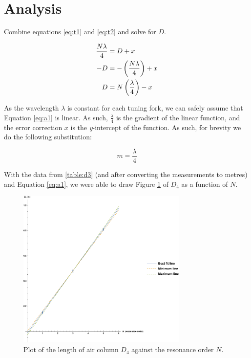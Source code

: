 \documentclass[letter]{article}
\numberwithin{equation}{section}
\numberwithin{figure}{section}
\numberwithin{table}{section}
\begin{document}
\section{Analysis}
Combine equations \eqref{eq:t1} and \eqref{eq:t2} and solve for \(D\).

\begin{align} \label{eq:a1}
  \frac{N \lambda}{4} &= D + x \notag \\
  -D &= - \left (\frac{N \lambda}{4} \right) + x \notag \\
  D &= N \left(\frac{\lambda}{4} \right) - x
\end{align}

\pagebreak[3]

As the wavelength \(\lambda\) is constant for each tuning fork, we can safely assume that Equation \eqref{eq:a1} is linear. As such, \(\frac{\lambda}{4}\) is the gradient of the linear function, and the error correction \(x\) is the \textit{y}-intercept of the function. As such, for brevity we do the following substitution: \nopagebreak[4]

\begin{equation} \label{eq:a2}
  m = \frac{\lambda}{4}
\end{equation}

With the data from \ref{table:d3} (and after converting the measurements to metres) and Equation \eqref{eq:a1}, we were able to draw Figure \ref{fig:plot1} of \(D_4\) as a function of \(N\).

\begin{figure}[!h]
  \centering
  \includegraphics[width=0.75\textwidth]{plot_pdf.png}
  \caption{Plot of the length of air column \(D_4\) against the resonance order \(N\).}
  \label{fig:plot1}
\end{figure}
\end{document}
